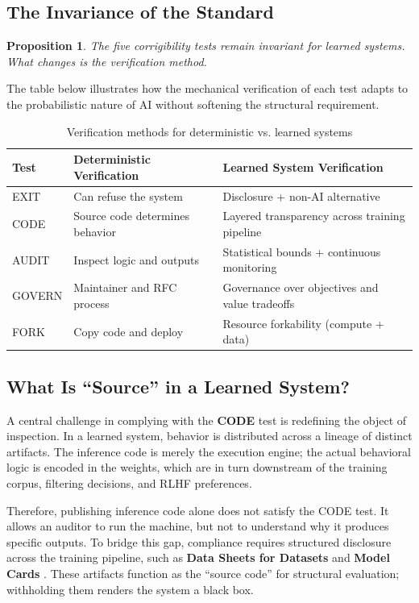 \documentclass{article}
\newtheorem{proposition}{Proposition}
\begin{document}
\subsection{The Invariance of the Standard}

\begin{proposition}
The five corrigibility tests remain invariant for learned systems. What changes is the verification method.
\end{proposition}

The table below illustrates how the mechanical verification of each test adapts to the probabilistic nature of AI without softening the structural requirement.

\begin{table}[htbp]
\centering
\begin{tabular}{@{}lll@{}}
\toprule
\textbf{Test} & \textbf{Deterministic Verification} & \textbf{Learned System Verification} \\
\midrule
EXIT & Can refuse the system & Disclosure + non-AI alternative \\
CODE & Source code determines behavior & Layered transparency across training pipeline \\
AUDIT & Inspect logic and outputs & Statistical bounds + continuous monitoring \\
GOVERN & Maintainer and RFC process & Governance over objectives and value tradeoffs \\
FORK & Copy code and deploy & Resource forkability (compute + data) \\
\bottomrule
\end{tabular}
\caption{Verification methods for deterministic vs. learned systems}
\end{table}

\subsection{What Is ``Source'' in a Learned System?}

A central challenge in complying with the \textbf{CODE} test is redefining the object of inspection. In a learned system, behavior is distributed across a lineage of distinct artifacts. The inference code is merely the execution engine; the actual behavioral logic is encoded in the weights, which are in turn downstream of the training corpus, filtering decisions, and RLHF preferences.

Therefore, publishing inference code alone does not satisfy the CODE test. It allows an auditor to run the machine, but not to understand why it produces specific outputs. To bridge this gap, compliance requires structured disclosure across the training pipeline, such as \textbf{Data Sheets for Datasets} \citep{gebru2021} and \textbf{Model Cards} \citep{mitchell2019}. These artifacts function as the ``source code'' for structural evaluation; withholding them renders the system a black box.
\end{document}
